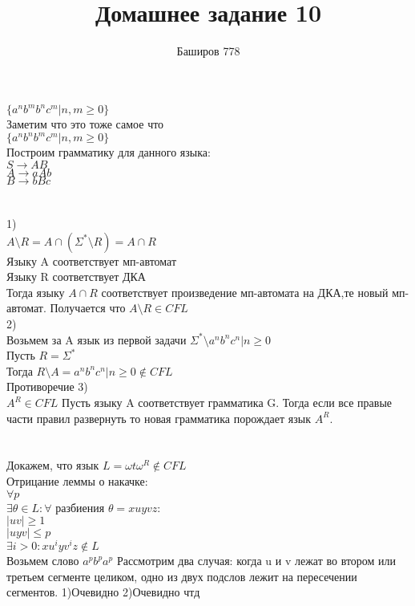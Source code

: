 \documentclass[a4paper,12pt]{article}
\author{Баширов 778}
\title{Домашнее задание 10}
\begin{document}
\maketitle
\newpage

\section{}
\section{}
$\lbrace a^nb^mb^nc^m | n, m \geq 0\rbrace$ \\
Заметим что это тоже самое что\\
$\lbrace a^nb^nb^mc^m | n, m \geq 0\rbrace$ \\
Построим грамматику для данного языка:\\
$S\rightarrow AB $\\
$A\rightarrow aAb$\\
$B\rightarrow bBc$\\
\section{}
1)\\
$A\setminus R = A\cap (\Sigma^*\setminus R) = A\cap R$\\
Языку A соответствует мп-автомат\\
Языку R соответствует ДКА\\
Тогда языку $A\cap R$ соответствует произведение мп-автомата на ДКА,те новый мп-автомат. Получается что $A\setminus R\in CFL$\\
2)\\
Возьмем за A язык из первой задачи $\Sigma^*\setminus {a^nb^nc^n|n\geq 0}$\\
Пусть $R = \Sigma^*$\\
Тогда $R\setminus A = {a^nb^nc^n|n\geq 0}\notin CFL$\\
Противоречие
3)\\
$A^R \in CFL$
Пусть языку A соответствует грамматика G. Тогда если все правые части правил развернуть то новая грамматика порождает язык $A^R$. 
\section{}
Докажем, что язык $L={\omega t\omega^R} \notin CFL$\\
Отрицание леммы о накачке:\\
$\forall p$\\
$\exists \theta \in L : \forall$ разбиения $\theta = xuyvz:$ \\$ |uv|\geq 1 $\\$|uyv|\leq p $\\$ \exists i>0 : xu^iyv^iz \notin L$\\
Возьмем слово $a^pb^pa^p$
Рассмотрим два случая: когда u и v лежат во втором или третьем сегменте целиком, одно из двух подслов лежит на пересечении сегментов.
1)Очевидно
2)Очевидно
чтд
\section{}
\end{document}
